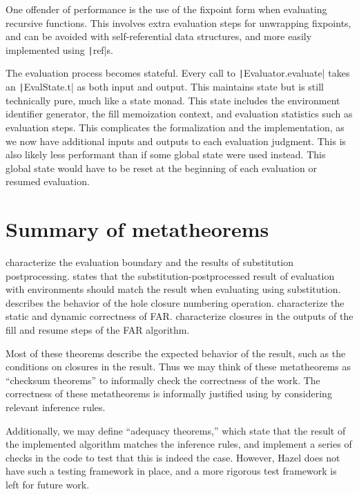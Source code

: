 One offender of performance is the use of the fixpoint form when evaluating recursive functions. This involves extra evaluation steps for unwrapping fixpoints, and can be avoided with self-referential data structures, and more easily implemented using \texttt|ref|s.

The evaluation process becomes stateful. Every call to \texttt|Evaluator.evaluate| takes an \texttt|EvalState.t| as both input and output. This maintains state but is still technically pure, much like a state monad. This state includes the environment identifier generator, the fill memoization context, and evaluation statistics such as evaluation steps. This complicates the formalization and the implementation, as we now have additional inputs and outputs to each evaluation judgment. This is also likely less performant than if some global state were used instead. This global state would have to be reset at the beginning of each evaluation or resumed evaluation.

\section{Summary of metatheorems}
\label{sec:metatheorem-summary}

 characterize the evaluation boundary and the results of substitution postprocessing.  states that the substitution-postprocessed result of evaluation with environments should match the result when evaluating using substitution.  describes the behavior of the hole closure numbering operation.  characterize the static and dynamic correctness of FAR.  characterize closures in the outputs of the fill and resume steps of the FAR algorithm.

Most of these theorems describe the expected behavior of the result, such as the conditions on closures in the result. Thus we may think of these metatheorems as ``checksum theorems'' to informally check the correctness of the work. The correctness of these metatheorems is informally justified using by considering relevant inference rules.

Additionally, we may define ``adequacy theorems,'' which state that the result of the implemented algorithm matches the inference rules, and implement a series of checks in the code to test that this is indeed the case. However, Hazel does not have such a testing framework in place, and a more rigorous test framework is left for future work.

